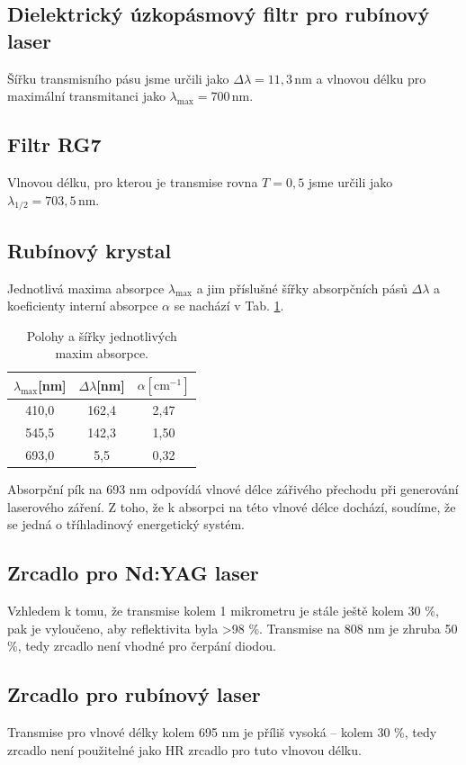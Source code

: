 	
	\subsection{Dielektrický úzkopásmový filtr pro rubínový laser}
	Šířku transmisního pásu jsme určili jako $\Delta\lambda=11,3\, \mathrm{nm}$ a vlnovou délku pro maximální transmitanci jako $\lambda_{\mathrm{max}}=700\,\mathrm{nm}$.
	
	\subsection{Filtr RG7}
	Vlnovou délku, pro kterou je transmise rovna $T=0,5$ jsme určili jako $\lambda_{1/2}=703,5\,\mathrm{nm}$.
	
	\subsection{Rubínový krystal}
	Jednotlivá maxima absorpce $\lambda_{\mathrm{max}}$ a jim příslušné šířky absorpčních pásů $\Delta\lambda$ a koeficienty interní absorpce $\alpha$ se nachází v Tab. \ref{tab:absorpce}.
\begin{table}[!hbt]
\centering
	\begin{tabular}{|c|c|c|}
		\hline
		$\lambda_{\mathrm{max}}$[nm] & $\Delta\lambda$[nm] & $\alpha[\mathrm{cm^{-1}}]$ \\ \hline\hline
		410,0 & 162,4 & 2,47\\ \hline
		545,5 & 142,3 &1,50\\ \hline
		693,0 & 5,5 & 0,32\\ \hline
	\end{tabular}
	\caption{Polohy a šířky jednotlivých maxim absorpce.}
	\label{tab:absorpce}
\end{table}
Absorpční pík na 693 nm odpovídá vlnové délce zářivého přechodu při generování laserového záření. Z toho, že k absorpci na této vlnové délce dochází, soudíme, že se jedná o tříhladinový energetický systém.

	
	\subsection{Zrcadlo pro Nd:YAG laser}	
	Vzhledem k tomu, že transmise kolem 1 mikrometru je stále ještě kolem 30 \%, pak je vyloučeno, aby reflektivita byla >98 \%. Transmise na 808 nm je zhruba 50 \%, tedy zrcadlo není vhodné pro čerpání diodou.
	
	\subsection{Zrcadlo pro rubínový laser}
	Transmise pro vlnové délky kolem 695 nm je příliš vysoká -- kolem 30 \%, tedy zrcadlo není použitelné jako HR zrcadlo pro tuto vlnovou délku.
	
